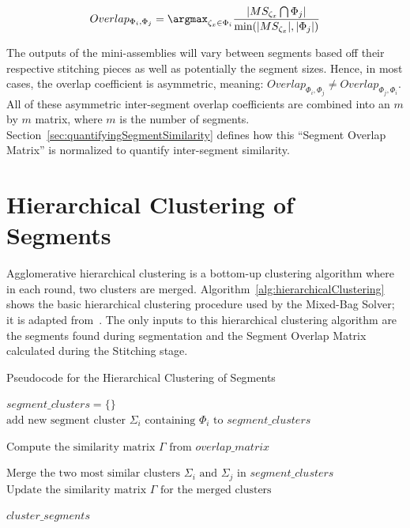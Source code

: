 \begin{equation} \label{eq:segmentOverlap}
Overlap_{\Phi_i,\Phi_j} = \argmax_{\zeta_x \in \Phi_i} {\frac{|MS_{\zeta_x} \bigcap \Phi_j|}{\text{min}(|MS_{\zeta_x}|, |\Phi_j|)}}
\end{equation}

The outputs of the mini-assemblies will vary between segments based off their respective stitching pieces as well as potentially the segment sizes.  Hence, in most cases, the overlap coefficient is asymmetric, meaning: $Overlap_{\Phi_i,\Phi_j} \neq Overlap_{\Phi_j,\Phi_i}$.  All of these asymmetric inter-segment overlap coefficients are combined into an $m$ by $m$ matrix, where $m$ is the number of segments.  Section~\ref{sec:quantifyingSegmentSimilarity} defines how this ``Segment Overlap Matrix'' is normalized to quantify inter-segment similarity.  

\section{Hierarchical Clustering of Segments}\label{sec:hierarchicalClustering}

Agglomerative hierarchical clustering is a bottom-up clustering algorithm where in each round, two clusters are merged.  Algorithm~\ref{alg:hierarchicalClustering} shows the basic hierarchical clustering procedure used by the Mixed-Bag Solver; it is adapted from~\cite{tanIntroToDataMining}.  The only inputs to this hierarchical clustering algorithm are the segments found during segmentation and the Segment Overlap Matrix calculated during the Stitching stage.

\begin{algorithm}[tb]
\caption{Pseudocode for the Hierarchical Clustering of Segments}\label{alg:hierarchicalClustering}
\begin{algorithmic}[1]
	\State $\textit{segment\_clusters} = \{ \}$	
		\State $\text{add new segment cluster } \Sigma_i \text{ containing } \Phi_i \text{ to } segment\_clusters$
	\EndFor
\item[]
    \State $\text{Compute the similarity matrix } \Gamma \text{ from } overlap\_matrix$
\item[]
    	\State $\text{Merge the two most similar clusters } \Sigma_i \text{ and } \Sigma_j \text{ in } \textit{segment\_clusters}$
    	\State $\text{Update the similarity matrix } \Gamma \text{ for the merged clusters}$
	\EndWhile
\item[]
    \State \Return $\textit{cluster\_segments}$
\EndFunction
\end{algorithmic}
\end{algorithm}

